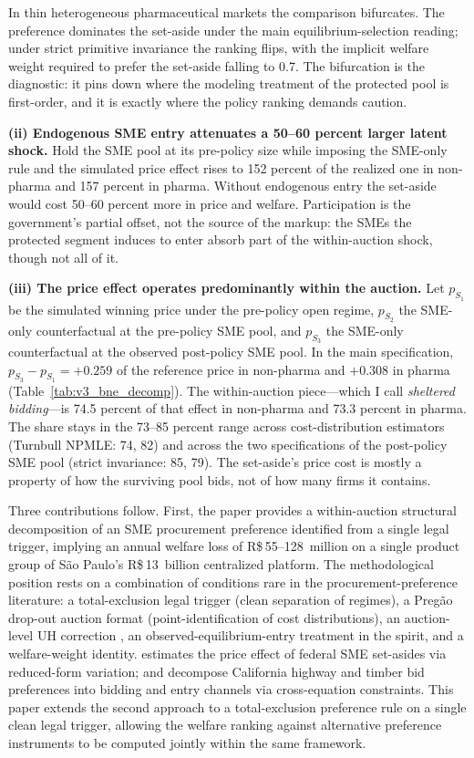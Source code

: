 In thin heterogeneous pharmaceutical markets the comparison bifurcates. The preference dominates the set-aside under the main equilibrium-selection reading; under strict primitive invariance the ranking flips, with the implicit welfare weight required to prefer the set-aside falling to 0.7. The bifurcation is the diagnostic: it pins down where the modeling treatment of the protected pool is first-order, and it is exactly where the policy ranking demands caution.

\noindent\textbf{(ii) Endogenous SME entry attenuates a 50--60 percent larger latent shock.} Hold the SME pool at its pre-policy size while imposing the SME-only rule and the simulated price effect rises to 152 percent of the realized one in non-pharma and 157 percent in pharma. Without endogenous entry the set-aside would cost 50--60 percent more in price and welfare. Participation is the government's partial offset, not the source of the markup: the SMEs the protected segment induces to enter absorb part of the within-auction shock, though not all of it.

\noindent\textbf{(iii) The price effect operates predominantly within the auction.} Let $p_{S_1}$ be the simulated winning price under the pre-policy open regime, $p_{S_2}$ the SME-only counterfactual at the pre-policy SME pool, and $p_{S_3}$ the SME-only counterfactual at the observed post-policy SME pool. In the main specification, $p_{S_3} - p_{S_1} = +0.259$ of the reference price in non-pharma and $+0.308$ in pharma (Table~\ref{tab:v3_bne_decomp}). The within-auction piece---which I call \emph{sheltered bidding}---is 74.5 percent of that effect in non-pharma and 73.3 percent in pharma. The share stays in the 73--85 percent range across cost-distribution estimators (Turnbull NPMLE: 74, 82) and across the two specifications of the post-policy SME pool (strict invariance: 85, 79). The set-aside's price cost is mostly a property of how the surviving pool bids, not of how many firms it contains.

Three contributions follow. First, the paper provides a within-auction structural decomposition of an SME procurement preference identified from a single legal trigger, implying an annual welfare loss of R\$\,55--128~million on a single product group of São Paulo's R\$\,13~billion centralized platform. The methodological position rests on a combination of conditions rare in the procurement-preference literature: a total-exclusion legal trigger (clean separation of regimes), a Preg\~ao drop-out auction format (point-identification of cost distributions), an auction-level UH correction \citep{krasnokutskaya2011}, an observed-equilibrium-entry treatment in the \citet{atheyseira2011} spirit, and a \citet{saezstantcheva2016} welfare-weight identity. \citet{marion2007} estimates the price effect of federal SME set-asides via reduced-form variation; \citet{krasnokutskaya2011} and \citet{atheyseira2011} decompose California highway and timber bid preferences into bidding and entry channels via cross-equation constraints. This paper extends the second approach to a total-exclusion preference rule on a single clean legal trigger, allowing the welfare ranking against alternative preference instruments to be computed jointly within the same framework.

